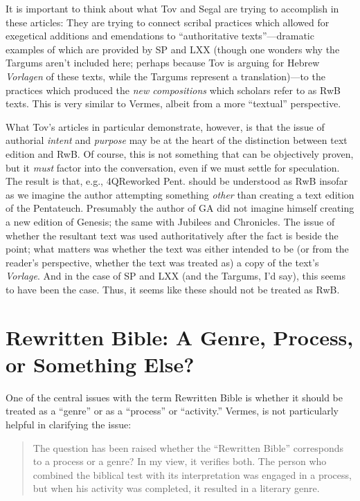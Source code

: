 It is important to think about what Tov and Segal are trying to
accomplish in these articles: They are trying to connect scribal
practices which allowed for exegetical additions and emendations to
``authoritative texts''---dramatic examples of which are provided by SP
and LXX (though one wonders why the Targums aren't included here;
perhaps because Tov is arguing for Hebrew \emph{Vorlagen} of these
texts, while the Targums represent a translation)---to the practices
which produced the \emph{new compositions} which scholars refer to as
RwB texts. This is very similar to Vermes, albeit from a more
``textual'' perspective.

What Tov's articles in particular demonstrate, however, is that the
issue of authorial \emph{intent} and \emph{purpose} may be at the heart
of the distinction between text edition and RwB. Of course, this is not
something that can be objectively proven, but it \emph{must} factor into
the conversation, even if we must settle for speculation. The result is
that, e.g., 4QReworked Pent. should be understood as RwB insofar as we
imagine the author attempting something \emph{other} than creating a
text edition of the Pentateuch. Presumably the author of GA did not
imagine himself creating a new edition of Genesis; the same with
Jubilees and Chronicles. The issue of whether the resultant text was
used authoritatively after the fact is beside the point; what matters
was whether the text was either intended to be (or from the reader's
perspective, whether the text was treated as) a copy of the text's
\emph{Vorlage}. And in the case of SP and LXX (and the Targums, I'd
say), this seems to have been the case. Thus, it seems like these should
not be treated as RwB.

\section{Rewritten Bible: A Genre, Process, or Something
Else?}\label{rwb-a-genre-process-or-something-else}

One of the central issues with the term Rewritten Bible is whether it
should be treated as a ``genre'' or as a ``process'' or ``activity.''
Vermes, is not particularly helpful in clarifying the issue:

\begin{quote}
The question has been raised whether the ``Rewritten Bible'' corresponds
to a process or a genre? In my view, it verifies both. The person who
combined the biblical test with its interpretation was engaged in a
process, but when his activity was completed, it resulted in a literary
genre.\autocite[8]{vermes_zsengeller2014}
\end{quote}

